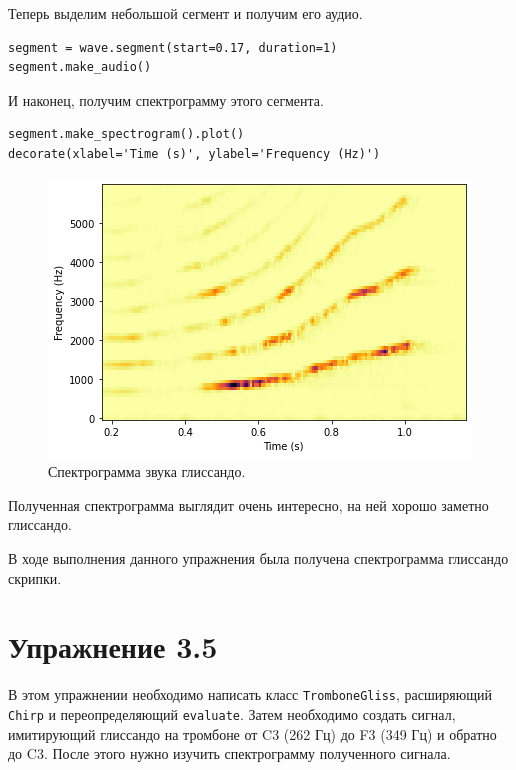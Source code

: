 \documentclass[a4paper, 14pt]{extarticle}
\begin{document}
    Теперь выделим небольшой сегмент и получим его аудио.

    \begin{lstlisting}[caption= Работа с сегментом., label={lst:task4_segment}]
segment = wave.segment(start=0.17, duration=1)
segment.make_audio()
    \end{lstlisting}

    И наконец, получим спектрограмму этого сегмента.

    \begin{lstlisting}[caption= Получение спекограммы., label={lst:task4_segment_spectrogram}]
segment.make_spectrogram().plot()
decorate(xlabel='Time (s)', ylabel='Frequency (Hz)')
    \end{lstlisting}

    \begin{figure}[h]
        \centering
        \includegraphics[width=0.8\linewidth]{resources/Images/task4_segment_spectrogram}
        \caption{Спектрограмма звука глиссандо.}
        \label{fig:task4_segment_spectrogram}
    \end{figure}

    Полученная спектрограмма выглядит очень интересно, на ней хорошо заметно глиссандо.

    В ходе выполнения данного упражнения была получена спектрограмма глиссандо скрипки.

    \newpage

    \section{Упражнение 3.5}
    \label{sec:task5}

    В этом упражнении необходимо написать класс \texttt{TromboneGliss}, расширяющий \texttt{Chirp} и переопределяющий
    \texttt{evaluate}. Затем необходимо создать сигнал, имитирующий глиссандо на тромбоне от C3 (262 Гц) до F3 (349 Гц)
    и обратно до C3. После этого нужно изучить спектрограмму полученного сигнала.
\end{document}
